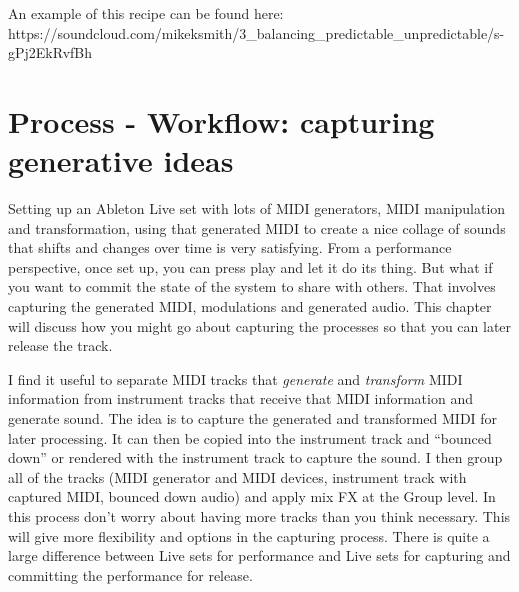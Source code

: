 \documentclass[
  12pt,
  letterpaper,
  oneside,
  open=any]{scrbook}
\begin{document}
An example of this recipe can be found here:
https://soundcloud.com/mikeksmith/3\_balancing\_predictable\_unpredictable/s-gPj2EkRvfBh


\chapter{Process - Workflow: capturing generative
ideas}\label{Chapter-011-Process-Workflow-Capturing_Ideas}

Setting up an Ableton Live set with lots of MIDI generators, MIDI
manipulation and transformation, using that generated MIDI to create a
nice collage of sounds that shifts and changes over time is very
satisfying. From a performance perspective, once set up, you can press
play and let it do its thing. But what if you want to commit the state
of the system to share with others. That involves capturing the
generated MIDI, modulations and generated audio. This chapter will
discuss how you might go about capturing the processes so that you can
later release the track.

\begin{tcolorbox}[enhanced jigsaw, opacitybacktitle=0.6, rightrule=.15mm, leftrule=.75mm, opacityback=0, toptitle=1mm, toprule=.15mm, breakable, titlerule=0mm, colback=white, bottomtitle=1mm, title=\textcolor{quarto-callout-tip-color}{\faLightbulb}\hspace{0.5em}{Key idea}, coltitle=black, left=2mm, colframe=quarto-callout-tip-color-frame, bottomrule=.15mm, colbacktitle=quarto-callout-tip-color!10!white, arc=.35mm]

I find it useful to separate MIDI tracks that \emph{generate} and
\emph{transform} MIDI information from instrument tracks that receive
that MIDI information and generate sound. The idea is to capture the
generated and transformed MIDI for later processing. It can then be
copied into the instrument track and ``bounced down'' or rendered with
the instrument track to capture the sound. I then group all of the
tracks (MIDI generator and MIDI devices, instrument track with captured
MIDI, bounced down audio) and apply mix FX at the Group level. In this
process don't worry about having more tracks than you think necessary.
This will give more flexibility and options in the capturing process.
There is quite a large difference between Live sets for performance and
Live sets for capturing and committing the performance for release.

\end{tcolorbox}
\end{document}
